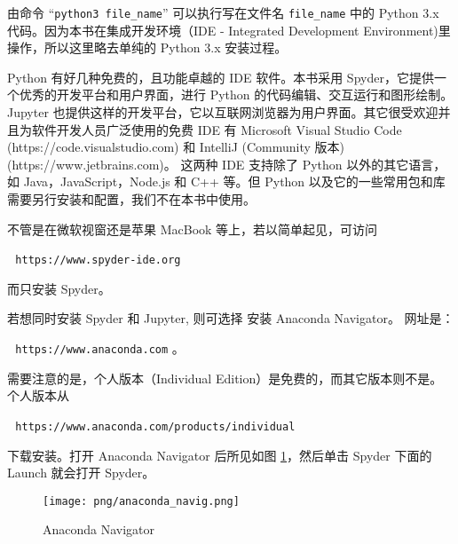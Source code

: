 \documentclass[main.tex]{subfiles}
\begin{document}
\noindent 由命令  “\texttt{python3 file\_name}”  可以执行写在文件名
\texttt{file\_name} 中的 Python 3.x 代码。因为本书在集成开发环境（IDE - Integrated Development Environment)里操作，所以这里略去单纯的 Python 3.x 安装过程。

Python 有好几种免费的，且功能卓越的 IDE 软件。本书采用 Spyder，它提供一个优秀的开发平台和用户界面，进行 Python 的代码编辑、交互运行和图形绘制。Jupyter 也提供这样的开发平台，它以互联网浏览器为用户界面。其它很受欢迎并且为软件开发人员广泛使用的免费 IDE 有 Microsoft Visual Studio Code (https://code.visualstudio.com) 和 IntelliJ (Community 版本) (https://www.jetbrains.com)。
这两种 IDE 支持除了 Python 以外的其它语言，如 Java，JavaScript，Node.js 和 C++ 等。但 Python 以及它的一些常用包和库需要另行安装和配置，我们不在本书中使用。  


不管是在微软视窗还是苹果 MacBook 等上，若以简单起见，可访问

\,\,\,\,\texttt{https://www.spyder-ide.org} 

\noindent 而只安装 Spyder。

若想同时安装 Spyder 和 Jupyter, 则可选择 
安装 Anaconda Navigator。 网址是：

\,\,\,\,\texttt{https://www.anaconda.com} 。

\noindent 需要注意的是，个人版本（Individual Edition）是免费的，而其它版本则不是。个人版本从

\,\,\,\,\texttt{https://www.anaconda.com/products/individual} 

\noindent 下载安装。打开 Anaconda Navigator 后所见如图 \ref{fig:2.1.1}，然后单击 Spyder 下面的 Launch 就会打开 Spyder。

\begin{figure}[h]
	\texttt{[image: png/anaconda\_navig.png]}
	\caption{Anaconda Navigator}\label{fig:2.1.1}
\end{figure}
\end{document}
